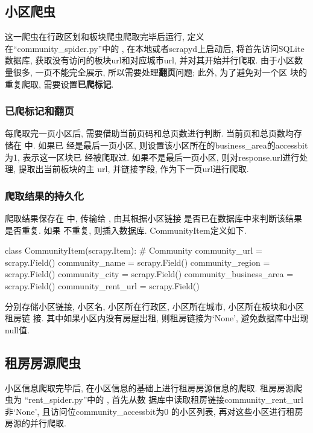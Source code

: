 \subsection{小区爬虫}
这一爬虫在行政区划和板块爬虫爬取完毕后运行, 定义在``community\_spider.py''中的
, 在本地或者scrapyd上启动后,
将首先访问SQLite数据库, 获取没有访问的板块url和对应城市url, 并对其开始并行爬取.
由于小区数量很多, 一页不能完全展示, 所以需要处理\textbf{翻页}问题; 此外, 为了避免对一个区
块的重复爬取, 需要设置\textbf{已爬标记}.

\subsubsection{已爬标记和翻页}
每爬取完一页小区后, 需要借助当前页码和总页数进行判断. 当前页和总页数均存储在
中. 如果已
经是最后一页小区, 则设置该小区所在的business\_area的accessbit为1, 表示这一区块已
经被爬取过. 如果不是最后一页小区, 则对response.url进行处理, 提取出当前板块的主
url, 并链接字段, 作为下一页url进行爬取.

\subsubsection{爬取结果的持久化}
爬取结果保存在  中, 传输给
 , 由其根据小区链接
 是否已在数据库中来判断该结果是否重复. 如果
不重复, 则插入数据库. CommunityItem定义如下.
\begin{python}
    class CommunityItem(scrapy.Item):
    # Community
    community_url = scrapy.Field()
    community_name = scrapy.Field()
    community_region = scrapy.Field()
    community_city = scrapy.Field()
    community_business_area = scrapy.Field()
    community_rent_url = scrapy.Field()
\end{python}
分别存储小区链接, 小区名, 小区所在行政区, 小区所在城市, 小区所在板块和小区租房链
接. 其中如果小区内没有房屋出租, 则租房链接为`None', 避免数据库中出现null值.

\subsection{租房房源爬虫}
小区信息爬取完毕后, 在小区信息的基础上进行租房房源信息的爬取. 租房房源爬虫为
``rent\_spider.py''中的 , 首先从数
据库中读取租房链接community\_rent\_url非`None', 且访问位community\_accessbit为0
的小区列表, 再对这些小区进行租房房源的并行爬取.